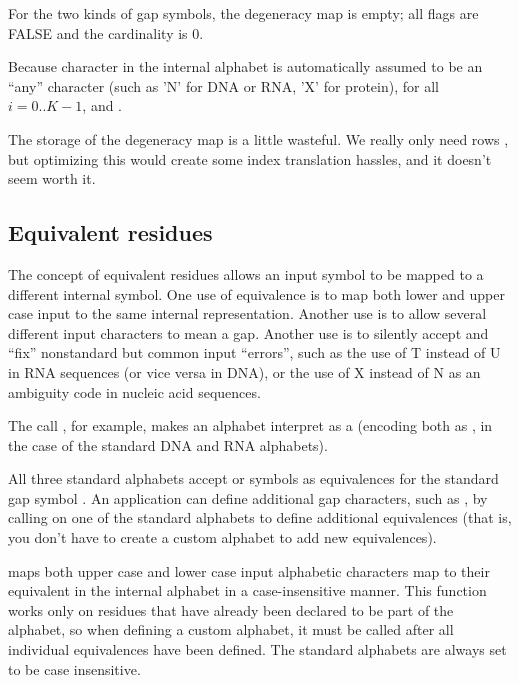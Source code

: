 For the two kinds of gap symbols, the degeneracy map is empty; all
flags are FALSE and the cardinality is 0.

Because character  in the internal alphabet is
automatically assumed to be an ``any'' character (such as 'N' for DNA
or RNA, 'X' for protein),  for all
$i=0..K-1$, and .

The storage of the degeneracy map is a little wasteful. We really only
need rows , but optimizing this would
create some index translation hassles, and it doesn't seem worth it.


\subsection{Equivalent residues}

The concept of equivalent residues allows an input symbol to be mapped
to a different internal symbol.  One use of equivalence is to map both
lower and upper case input to the same internal representation.
Another use is to allow several different input characters to mean a
gap. Another use is to silently accept and ``fix'' nonstandard but
common input ``errors'', such as the use of T instead of U in RNA
sequences (or vice versa in DNA), or the use of X instead of N as an
ambiguity code in nucleic acid sequences.

The call , for example,
makes an alphabet interpret  as a  (encoding both as
, in the case of the standard DNA and RNA alphabets).
 
All three standard alphabets accept \ccode{\_} or   symbols
as equivalences for the standard gap symbol \ccode{-}. An application
can define additional gap characters, such as \ccode{,}, by calling
 on one of the standard
alphabets to define additional equivalences (that is, you don't have
to create a custom alphabet to add new equivalences).

 maps both upper case and
lower case input alphabetic characters map to their equivalent in the
internal alphabet in a case-insensitive manner.  This function works
only on residues that have already been declared to be part of the
alphabet, so when defining a custom alphabet, it must be called after
all individual equivalences have been defined. The standard alphabets
are always set to be case insensitive.

